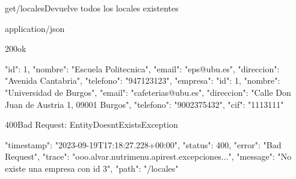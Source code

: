 \begin{apiRoute}{get}{/locales}{Devuelve todos los locales existentes}
	
	\begin{routeParameter}
	\end{routeParameter}
	
	\begin{routeResponse}{application/json}
		\begin{routeResponseItem}{200}{ok}
			\begin{routeResponseItemBody}
{
	"id": 1,
	"nombre": "Escuela Politecnica",
	"email": "eps@ubu.es",
	"direccion": "Avenida Cantabria",
	"telefono": "947123123",
	"empresa": {
		"id": 1,
		"nombre": "Universidad de Burgos",
		"email": "cafeterias@ubu.es",
		"direccion": "Calle Don Juan de Austria 1, 09001 Burgos",
		"telefono": "9002375432",
		"cif": "1113111"
        }
    }
			\end{routeResponseItemBody}
		\end{routeResponseItem}
		\begin{routeResponseItem}{400}{Bad Request: EntityDoesntExistsException}
			\begin{routeResponseItemBody}
{
    "timestamp": "2023-09-19T17:18:27.228+00:00",
    "status": 400,
    "error": "Bad Request",
    "trace": "ooo.alvar.nutrimenu.apirest.excepciones...",
    "message": "No existe una empresa con id 3",
    "path": "/locales"
}
			\end{routeResponseItemBody}
		\end{routeResponseItem}
	\end{routeResponse}
	
\end{apiRoute}

